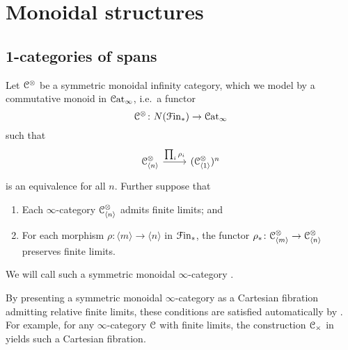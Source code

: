 \documentclass[main.tex]{subfiles}
\begin{document}
\section{Monoidal structures}
\label{sec:monoidal_structures}

\subsection{1-categories of spans}
\label{ssc:1_categories_of_spans}

Let $\mathcal{C}^{\otimes}$ be a symmetric monoidal infinity category, which we model by a commutative monoid in $\mathcal{C}\mathrm{at}_{\infty}$, i.e.\ a functor
\begin{equation*}
  \mathcal{C}^{\otimes}\colon N(\mathcal{F}\mathrm{in}_{*}) \to \mathcal{C}\mathrm{at}_{\infty}
\end{equation*}
such that
\begin{equation*}
  \begin{tikzcd}
    \category{C}^{\otimes}_{\langle n \rangle}
    \arrow[r, "\prod_{i} \rho_{i}"]
    & (\category{C}^{\otimes}_{\langle 1 \rangle})^{n}
  \end{tikzcd}
\end{equation*}
is an equivalence for all $n$. Further suppose that
\begin{enumerate}
  \item Each $\infty$-category $\mathcal{C}^{\otimes}_{\langle n \rangle}$ admits finite limits; and

  \item For each morphism $\rho\colon \langle m \rangle \to \langle n \rangle$ in $\mathcal{F}\mathrm{in}_{*}$, the functor $\rho_{*}\colon \mathcal{C}^{\otimes}_{\langle m \rangle} \to \mathcal{C}^{\otimes}_{\langle n \rangle}$ preserves finite limits.
\end{enumerate}

\begin{definition}
  We will call such a symmetric monoidal $\infty$-category .
\end{definition}

\begin{note}
  By presenting a symmetric monoidal $\infty$-category as a Cartesian fibration admitting relative finite limits, these conditions are satisfied automatically by \cite[Prop.~4.3.1.10]{highertopostheory}. For example, for any $\infty$-category $\mathcal{C}$ with finite limits, the construction $\mathcal{C}_{\times}$ in \cite{spectralmackeyfunctors2} yields such a Cartesian fibration.
\end{note}
\end{document}
